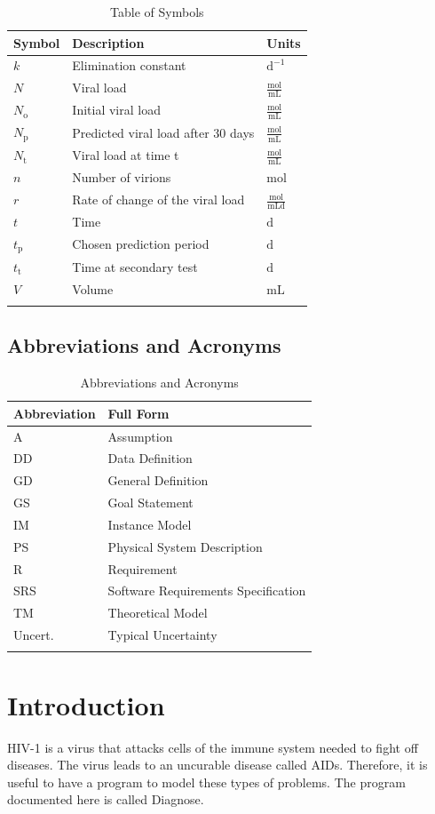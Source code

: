 \documentclass[12pt]{article}
\begin{document}
\begin{longtable}{l l l}
\toprule
\textbf{Symbol} & \textbf{Description} & \textbf{Units}
\\
\midrule
\endhead
$k$ & Elimination constant & $\text{d}^{-1}$
\\
$N$ & Viral load & $\frac{\text{mol}}{\text{mL}}$
\\
${N_{\text{o}}}$ & Initial viral load & $\frac{\text{mol}}{\text{mL}}$
\\
${N_{\text{p}}}$ & Predicted viral load after 30 days & $\frac{\text{mol}}{\text{mL}}$
\\
${N_{\text{t}}}$ & Viral load at time t & $\frac{\text{mol}}{\text{mL}}$
\\
$n$ & Number of virions & ${\text{mol}}$
\\
$r$ & Rate of change of the viral load & $\frac{\text{mol}}{\text{mL}\text{d}}$
\\
$t$ & Time & ${\text{d}}$
\\
${t_{\text{p}}}$ & Chosen prediction period & ${\text{d}}$
\\
${t_{\text{t}}}$ & Time at secondary test & ${\text{d}}$
\\
$V$ & Volume & ${\text{mL}}$
\\
\bottomrule
\caption{Table of Symbols}
\label{Table:ToS}
\end{longtable}
\subsection{Abbreviations and Acronyms}
\label{Sec:TAbbAcc}
\begin{longtable}{l l}
\toprule
\textbf{Abbreviation} & \textbf{Full Form}
\\
\midrule
\endhead
A & Assumption
\\
DD & Data Definition
\\
GD & General Definition
\\
GS & Goal Statement
\\
IM & Instance Model
\\
PS & Physical System Description
\\
R & Requirement
\\
SRS & Software Requirements Specification
\\
TM & Theoretical Model
\\
Uncert. & Typical Uncertainty
\\
\bottomrule
\caption{Abbreviations and Acronyms}
\label{Table:TAbbAcc}
\end{longtable}
\section{Introduction}
\label{Sec:Intro}
HIV-1 is a virus that attacks cells of the immune system needed to fight off diseases. The virus leads to an uncurable disease called AIDs. Therefore, it is useful to have a program to model these types of problems. The program documented here is called Diagnose.
\end{document}
